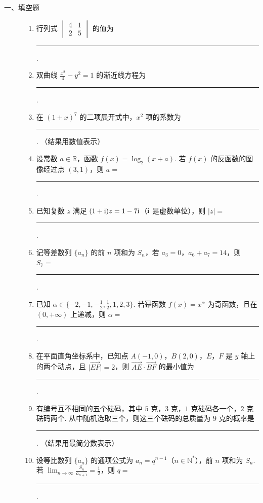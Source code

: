 \begin{description}

    \item[一、填空题]

    \begin{enumerate}[leftmargin=5pt]

        \item 行列式 \(\begin{vmatrix}4 & 1\\2 & 5\end{vmatrix}\) 的值为\rule[-0.3ex]{3em}{0.4pt}.

        \item 双曲线 \(\frac{x^2}{4}-y^2=1\) 的渐近线方程为\rule[-0.3ex]{3em}{0.4pt}.

        \item 在 \((1+x)^7\) 的二项展开式中，\(x^2\) 项的系数为\rule[-0.3ex]{3em}{0.4pt}. （结果用数值表示）

        \item 设常数 \(a\in\mathbb{R}\)，函数 \(f(x)=\log_2(x+a)\). 若 \(f(x)\) 的反函数的图像经过点 \((3,1)\)，则 \(a=\)\rule[-0.3ex]{3em}{0.4pt}.

        \item 已知复数 \(z\) 满足 \((1+\mathrm{i})z=1-7\mathrm{i}\)（\(\mathrm{i}\) 是虚数单位），则 \(\lvert z\rvert=\)\rule[-0.3ex]{3em}{0.4pt}.

        \item 记等差数列 \(\{a_n\}\) 的前 \(n\) 项和为 \(S_n\)，若 \(a_3=0\)，\(a_6+a_7=14\)，则 \(S_7=\)\rule[-0.3ex]{3em}{0.4pt}.

        \item 已知 \(\alpha\in\{-2,-1,-\frac12,\frac12,1,2,3\}\). 若幂函数 \(f(x)=x^\alpha\) 为奇函数，且在 \((0,+\infty)\) 上递减，则 \(\alpha=\)\rule[-0.3ex]{3em}{0.4pt}.

        \item 在平面直角坐标系中，已知点 \(A(-1,0)\)，\(B(2,0)\)，\(E\)，\(F\) 是 \(y\) 轴上的两个动点，且 \(\lvert\overrightarrow{EF}\rvert=2\)，则 \(\overrightarrow{AE}\cdot\overrightarrow{BF}\) 的最小值为\rule[-0.3ex]{3em}{0.4pt}.

        \item 有编号互不相同的五个砝码，其中 \(5\) 克，\(3\) 克，\(1\) 克砝码各一个，\(2\) 克砝码两个. 从中随机选取三个，则这三个砝码的总质量为 \(9\) 克的概率是\rule[-0.3ex]{3em}{0.4pt}. （结果用最简分数表示）

        \item 设等比数列 \(\{a_n\}\) 的通项公式为 \(a_n=q^{n-1}\)（\(n\in\mathbb{N}^*\)），前 \(n\) 项和为 \(S_n\). 若 \(\displaystyle\lim_{n\to\infty}\frac{S_n}{a_{n+1}}=\frac12\)，则 \(q=\)\rule[-0.3ex]{3em}{0.4pt}.


\end{enumerate}
\end{description}
